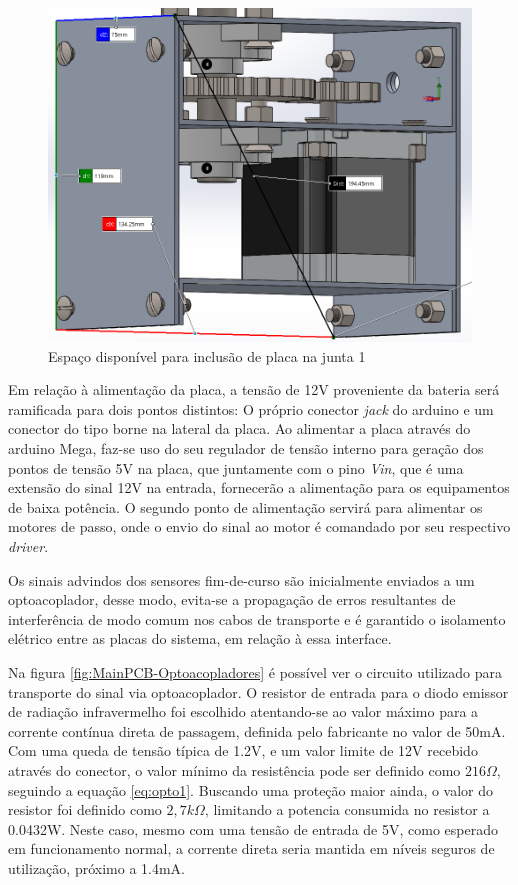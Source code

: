 \begin{figure}[h]
    \caption{Espaço disponível para inclusão de placa na junta 1}    
    \begin{centering}

        \includegraphics[width=0.7\columnwidth]{images/pcbs/MainPCB-Dimensoes.png}
    
    \par\end{centering}

    \label{fig:TamanhoPCB-Junta1}
\end{figure}

Em relação à alimentação da placa, a tensão de 12V proveniente da bateria será
ramificada para dois pontos distintos: O próprio conector \textit{jack}
do arduino e um conector do tipo borne na lateral da placa.
Ao alimentar a placa através do arduino Mega, faz-se uso do seu 
regulador de tensão interno para geração dos pontos de tensão 5V na 
placa, que juntamente com o pino \textit{Vin}, que é uma extensão do 
sinal 12V na entrada, fornecerão a alimentação para os equipamentos de 
baixa potência. 
O segundo ponto de alimentação servirá para alimentar os motores de 
passo, onde o envio do sinal ao motor é comandado por seu respectivo 
\textit{driver}.

Os sinais advindos dos sensores fim-de-curso são inicialmente enviados
a um optoacoplador, desse modo, evita-se a propagação de erros resultantes 
de interferência de modo comum nos cabos de transporte e é garantido 
o isolamento elétrico entre as placas do sistema, em relação à essa 
interface.

Na figura \ref{fig:MainPCB-Optoacopladores} é possível ver o circuito
utilizado para transporte do sinal via optoacoplador. O resistor de entrada 
para o diodo emissor de radiação infravermelho foi escolhido atentando-se 
ao valor máximo para a corrente contínua direta de passagem, definida
pelo fabricante no valor de 50mA. Com uma queda de tensão típica de 1.2V,
e um valor limite de 12V recebido através do conector, o valor mínimo
da resistência pode ser definido como $216\Omega$, seguindo a equação \ref{eq:opto1}.
Buscando uma proteção maior ainda, o valor do resistor foi definido como $2,7k\Omega$, 
limitando a potencia consumida no resistor a 0.0432W.
Neste caso, mesmo com uma tensão de entrada de 5V, como esperado em funcionamento
normal, a corrente direta seria mantida em níveis seguros de utilização,
próximo a 1.4mA.

